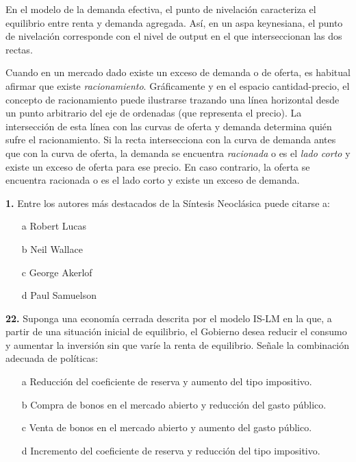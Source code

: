 \documentclass{nuevotema}
\begin{document}
En el modelo de la demanda efectiva, el punto de nivelación caracteriza el equilibrio entre renta y demanda agregada. Así, en un aspa keynesiana, el punto de nivelación corresponde con el nivel de output en el que interseccionan las dos rectas.


Cuando en un mercado dado existe un exceso de demanda o de oferta, es habitual afirmar que existe \textit{racionamiento}. Gráficamente y en el espacio cantidad-precio, el concepto de racionamiento puede ilustrarse trazando una línea horizontal desde un punto arbitrario del eje de ordenadas (que representa el precio). La intersección de esta línea con las curvas de oferta y demanda determina quién sufre el racionamiento. Si la recta intersecciona con la curva de demanda antes que con la curva de oferta, la demanda se encuentra \textit{racionada} o es el \textit{lado corto} y existe un exceso de oferta para ese precio. En caso contrario, la oferta se encuentra racionada o es el lado corto y existe un exceso de demanda.


\preguntas


\textbf{1.} Entre los autores más destacados de la Síntesis Neoclásica puede citarse a:

\begin{itemize}
	\item[a] Robert Lucas
	\item[b] Neil Wallace
	\item[c] George Akerlof
	\item[d] Paul Samuelson
\end{itemize}


\textbf{22.} Suponga una economía cerrada descrita por el modelo IS-LM en la que, a partir de una situación inicial de equilibrio, el Gobierno desea reducir el consumo y aumentar la inversión sin que varíe la renta de equilibrio. Señale la combinación adecuada de políticas:

\begin{enumerate}
	\item[a] Reducción del coeficiente de reserva y aumento del tipo impositivo.
	\item[b] Compra de bonos en el mercado abierto y reducción del gasto público.
	\item[c] Venta de bonos en el mercado abierto y aumento del gasto público.
	\item[d] Incremento del coeficiente de reserva y reducción del tipo impositivo.
\end{enumerate}
\end{document}
